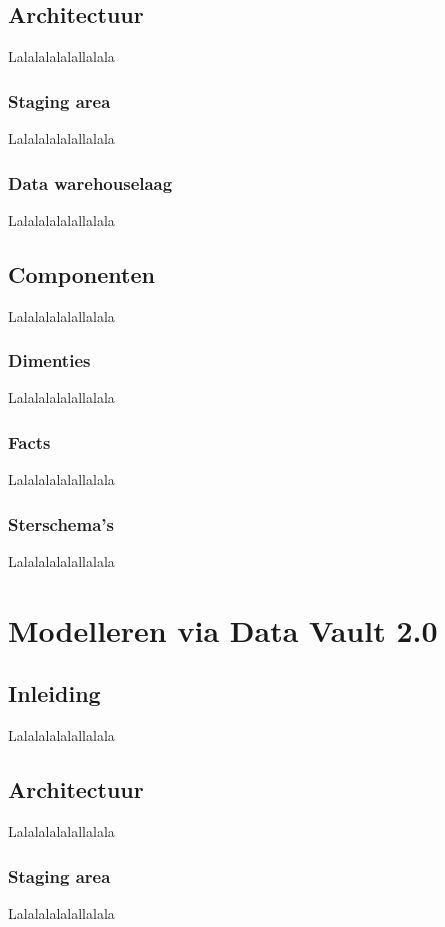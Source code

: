 \subsection{Architectuur}
Lalalalalalallalala

\subsubsection{Staging area}
Lalalalalalallalala

\subsubsection{Data warehouselaag}
Lalalalalalallalala

\subsection{Componenten}
Lalalalalalallalala

\subsubsection{Dimenties}
Lalalalalalallalala

\subsubsection{Facts}
Lalalalalalallalala

\subsubsection{Sterschema's}
Lalalalalalallalala

\section{Modelleren via Data Vault 2.0}

\subsection{Inleiding}
Lalalalalalallalala

\subsection{Architectuur}
Lalalalalalallalala

\subsubsection{Staging area}
Lalalalalalallalala

